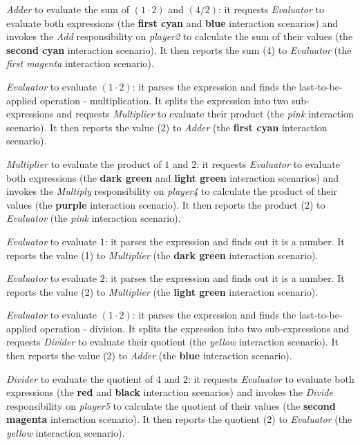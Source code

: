 \textit{Adder} to evaluate the sum of $(1\cdot2)$ and $(4/2)$: it requests \textit{Evaluator} to evaluate both expressions (the \textbf{first cyan} and \textbf{blue} interaction scenarios) and invokes the \textit{Add} responsibility on \textit{player2} to calculate the sum of their values (the \textbf{second cyan} interaction scenario).
It then reports the sum (4) to \textit{Evaluator} (the \textit{first magenta} interaction scenario).

\textit{Evaluator} to evaluate $(1\cdot2)$: it parses the expression and finds the last-to-be-applied operation - multiplication.
It splits the expression into two sub-expressions and requests \textit{Multiplier} to evaluate their product (the \textit{pink} interaction scenario).
It then reports the value (2) to \textit{Adder} (the \textbf{first cyan} interaction scenario).

\textit{Multiplier} to evaluate the product of $1$ and $2$: it requests \textit{Evaluator} to evaluate both expressions (the \textbf{dark green} and \textbf{light green} interaction scenarios) and invokes the \textit{Multiply} responsibility on \textit{player4} to calculate the product of their values (the \textbf{purple} interaction scenario).
It then reports the product (2) to \textit{Evaluator} (the \textit{pink} interaction scenario).

\textit{Evaluator} to evaluate $1$: it parses the expression and finds out it is a number.
It reports the value (1) to \textit{Multiplier} (the \textbf{dark green} interaction scenario).

\textit{Evaluator} to evaluate $2$: it parses the expression and finds out it is a number.
It reports the value (2) to \textit{Multiplier} (the \textbf{light green} interaction scenario).

\textit{Evaluator} to evaluate $(1\cdot2)$: it parses the expression and finds the last-to-be-applied operation - division.
It splits the expression into two sub-expressions and requests \textit{Divider} to evaluate their quotient (the \textit{yellow} interaction scenario).
It then reports the value (2) to \textit{Adder} (the \textbf{blue} interaction scenario).

\textit{Divider} to evaluate the quotient of $4$ and $2$: it requests \textit{Evaluator} to evaluate both expressions (the \textbf{red} and \textbf{black} interaction scenarios) and invokes the \textit{Divide} responsibility on \textit{player5} to calculate the quotient of their values (the \textbf{second magenta} interaction scenario).
It then reports the quotient (2) to \textit{Evaluator} (the \textit{yellow} interaction scenario).

